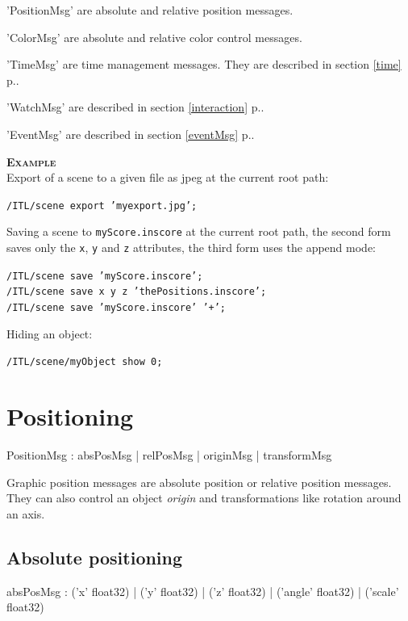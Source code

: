 \documentclass[a4paper,twoside]{report}
\newcommand{\sublevel}[1]	{\section{#1}}
\newcommand{\subsublevel}[1]	{\subsection{#1}}
\newcommand{\fullref}[1]	{\ref{#1} p.\pageref{#1}}
\newcommand{\OSC}[1]		{\texttt{#1}}
\newcommand{\example}		{\textbf{\hspace{-1.5cm}\textbf{\textsc{Example }}}}
\let\olditemize\itemize
\let\oldenditemize\enditemize
\renewenvironment{itemize} 	{\olditemize \setlength{\itemsep}{1mm}}{\oldenditemize}
\newcommand{\sample}	[1]			{\vspace{-2mm}\begin{center}\colorbox{mygrey}{
								\begin{minipage}[t]{0.9\columnwidth} 
								{\small \texttt{#1}}
								\end{minipage}}\end{center}}
\begin{document}
\begin{itemize}
\item 'PositionMsg' are absolute and relative position messages.
\item 'ColorMsg' are absolute and relative color control messages.
\item 'TimeMsg' are time management messages. They are described in section \fullref{time}.
\item 'WatchMsg' are described in section \fullref{interaction}.
\item 'EventMsg' are described in section \fullref{eventMsg}.
\end{itemize}

\example \\
Export of a scene to a given file as jpeg at the current root path:
\sample{/ITL/scene export 'myexport.jpg';}
Saving a scene to \OSC{myScore.inscore} at the current root path, the second form saves only the \OSC{x}, \OSC{y} and \OSC{z} attributes, the third form uses the append mode:
\sample{/ITL/scene save 'myScore.inscore';\\
/ITL/scene save x y z 'thePositions.inscore'; \\
/ITL/scene save 'myScore.inscore' '+';}
Hiding an object:
\sample{/ITL/scene/myObject show 0;}

\sublevel{Positioning}

\begin{rail}
PositionMsg : 		absPosMsg 
				|	relPosMsg 
				|	originMsg 
				| 	transformMsg
\end{rail}

Graphic position messages are absolute position or relative position messages. They can also control an object \emph{origin} and transformations like rotation around an axis.

\subsublevel{Absolute positioning}

\begin{rail}
absPosMsg :  
			('x' float32)
		| 	('y' float32)
		| 	('z' float32)
		| 	('angle' float32)
		| 	('scale' float32) 
\end{rail}
\end{document}
